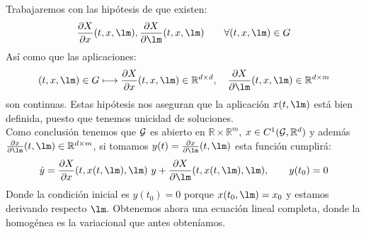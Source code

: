 \noindent
Trabajaremos con las hipótesis de que existen:
\begin{equation*}
    \frac{\partial X}{\partial x}(t,x,\lm), \frac{\partial X}{\partial \lm}(t,x,\lm)\qquad \forall (t,x,\lm)\in G
\end{equation*}
Así como que las aplicaciones:
\begin{equation*}
    (t,x,\lm)\in G \longmapsto \frac{\partial X}{\partial x}(t,x,\lm)\in \mathbb{R}^{d\times d},\quad  \frac{\partial X}{\partial \lm}(t,x,\lm)\in \mathbb{R}^{d\times m}
\end{equation*}
son continuas. Estas hipótesis nos aseguran que la aplicación $x(t,\lm)$ está bien definida, puesto que tenemos unicidad de soluciones.\\

\noindent
Como conclusión tenemos que $\mathcal{G}$ es abierto en $\mathbb{R}\times\mathbb{R}^m$, $x\in C^1(\mathcal{G},\mathbb{R}^d)$ y además $\frac{\partial x}{\partial \lm}(t,\lm)\in \mathbb{R}^{d\times m}$, si tomamos $y(t) = \frac{\partial x}{\partial \lm}(t,\lm)$ esta función cumplirá:
\begin{equation*}
    \dot{y} = \frac{\partial X}{\partial x}(t,x(t,\lm),\lm)\ y + \frac{\partial X}{\partial \lm}(t,x(t,\lm),\lm), \qquad y(t_0) = 0
\end{equation*}
Donde la condición inicial es $y(t_0) = 0$ porque $x(t_0,\lm) = x_0$ y estamos derivando respecto $\lm$. Obtenemos ahora una ecuación lineal completa, donde la homogénea es la variacional que antes obteníamos.\\

